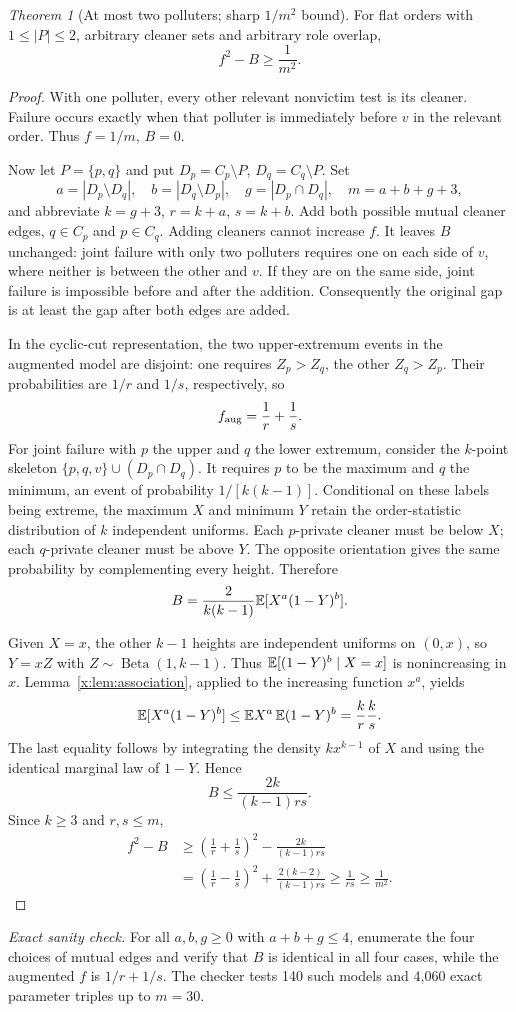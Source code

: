\documentclass[11pt,a4paper]{article}
\theoremstyle{definition}\newtheorem{definition}[theorem]{Definition}
\theoremstyle{remark}\newtheorem{remark}[theorem]{Remark}
\newtheorem{xtheorem}{Theorem}\renewcommand{\thextheorem}{A.\arabic{xtheorem}}
\theoremstyle{definition}\newtheorem{xexample}[xtheorem]{Example}\theoremstyle{plain}
\newcommand{\xcheck}[1]{\par\smallskip\textit{Exact sanity check.} #1\par}
\begin{document}
\begin{xtheorem}[At most two polluters; sharp $1/m^2$ bound]\label{x:thm:two}
For flat orders with $1\le|P|\le2$, arbitrary cleaner sets and arbitrary role overlap,
\[
f^2-B\ge\frac1{m^2}.
\]
\end{xtheorem}
\begin{proof}
With one polluter, every other relevant nonvictim test is its cleaner. Failure occurs exactly when that polluter is immediately before $v$ in the relevant order. Thus $f=1/m$, $B=0$.

Now let $P=\{p,q\}$ and put $D_p=C_p\setminus P$, $D_q=C_q\setminus P$. Set
\[
a=|D_p\setminus D_q|,\quad b=|D_q\setminus D_p|,\quad
g=|D_p\cap D_q|,\quad m=a+b+g+3,
\]
and abbreviate $k=g+3$, $r=k+a$, $s=k+b$. Add both possible mutual cleaner edges, $q\in C_p$ and $p\in C_q$. Adding cleaners cannot increase $f$. It leaves $B$ unchanged: joint failure with only two polluters requires one on each side of $v$, where neither is between the other and $v$. If they are on the same side, joint failure is impossible before and after the addition. Consequently the original gap is at least the gap after both edges are added.

In the cyclic-cut representation, the two upper-extremum events in the augmented model are disjoint: one requires $Z_p>Z_q$, the other $Z_q>Z_p$. Their probabilities are $1/r$ and $1/s$, respectively, so
\[
f_{\rm aug}=\frac1r+\frac1s.
\]
For joint failure with $p$ the upper and $q$ the lower extremum, consider the $k$-point skeleton $\{p,q,v\}\cup(D_p\cap D_q)$. It requires $p$ to be the maximum and $q$ the minimum, an event of probability $1/[k(k-1)]$. Conditional on these labels being extreme, the maximum $X$ and minimum $Y$ retain the order-statistic distribution of $k$ independent uniforms. Each $p$-private cleaner must be below $X$; each $q$-private cleaner must be above $Y$. The opposite orientation gives the same probability by complementing every height. Therefore
\begin{equation}\label{x:eq:twoB}
B=\frac{2}{k(k-1)}\mathbb E[X^a(1-Y)^b].
\end{equation}

Given $X=x$, the other $k-1$ heights are independent uniforms on $(0,x)$, so $Y=xZ$ with $Z\sim\operatorname{Beta}(1,k-1)$. Thus $\mathbb E[(1-Y)^b\mid X=x]$ is nonincreasing in $x$. Lemma~\ref{x:lem:association}, applied to the increasing function $x^a$, yields
\[
\mathbb E[X^a(1-Y)^b]\le\mathbb E X^a\,\mathbb E(1-Y)^b
=\frac{k}{r}\frac{k}{s}.
\]
The last equality follows by integrating the density $kx^{k-1}$ of $X$ and using the identical marginal law of $1-Y$. Hence
\[
B\le\frac{2k}{(k-1)rs}.
\]
Since $k\ge3$ and $r,s\le m$,
\begin{align*}
f^2-B
&\ge\left(\frac1r+\frac1s\right)^2-\frac{2k}{(k-1)rs}\\
&=\left(\frac1r-\frac1s\right)^2+\frac{2(k-2)}{(k-1)rs}
\ge\frac1{rs}\ge\frac1{m^2}.
\end{align*}
\end{proof}
\xcheck{For all $a,b,g\ge0$ with $a+b+g\le4$, enumerate the four choices of mutual edges and verify that $B$ is identical in all four cases, while the augmented $f$ is $1/r+1/s$. The checker tests 140 such models and 4,060 exact parameter triples up to $m=30$.}
\end{document}
